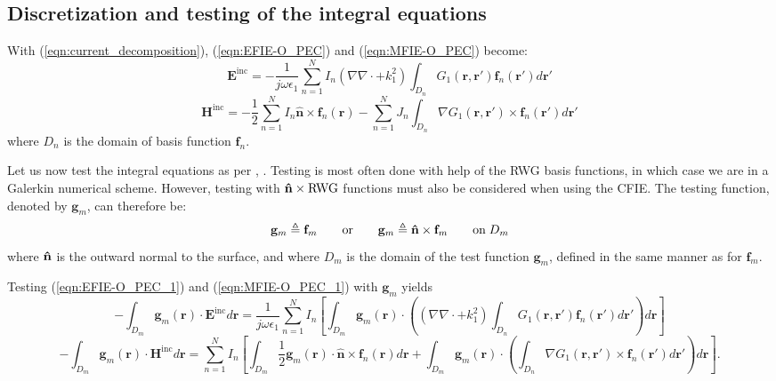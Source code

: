 \documentclass[a4paper,10pt]{book}
\newcommand{\field}[1]{\mathbf{#1}}
\newcommand{\current}[1]{\mathbf{#1}}
\newcommand{\vect}[1]{\mathbf{#1}}
\newcommand{\uvect}[1]{\ensuremath{\mathbf{\Hat{#1}}}}
\renewcommand{\arg}[1]{\ensuremath{\!\left(#1\right)}}
\begin{document}
\subsection{Discretization and testing of the integral equations}
%
\par
With (\ref{eqn:current_decomposition}), (\ref{eqn:EFIE-O_PEC}) and (\ref{eqn:MFIE-O_PEC}) become:
\begin{equation}\label{eqn:EFIE-O_PEC_1}
\field{E}^\text{inc} =  - \frac{1}{j \omega \epsilon_1} \sum_{n=1}^{N} I_n \left(\nabla \nabla \cdot + k_1^2\right) \int_{D_n} G_1\left(\vect{r}, \vect{r}'\right) \current{f}_n\left(\vect{r}'\right) d\vect{r}'
\end{equation}
\begin{equation}\label{eqn:MFIE-O_PEC_1}
\field{H}^\text{inc} = - \frac{1}{2} \sum_{n=1}^{N} I_n \vect{\hat{n}} \times \current{f}_{n}\arg{\vect{r}} - \sum_{n=1}^{N} J_n \int_{D_n} \nabla G_1\left(\vect{r}, \vect{r}'\right) \times \current{f}_n\left(\vect{r}'\right) d\vect{r}'
\end{equation}
where $D_n$ is the domain of basis function $\vect{f}_n$.
%
\par
Let us now test the integral equations as per \cite{Har_68}, \cite{Rao_82}. Testing is most often done with help of the RWG basis functions, in which case we are in a Galerkin numerical scheme.  However, testing with $\uvect{n} \times \text{RWG}$ functions must also be considered when using the CFIE. The testing function, denoted by $\vect{g}_m$, can therefore be:
\begin{equation}
\vect{g}_m \triangleq \vect{f}_m \qquad \text{or} \qquad \vect{g}_m \triangleq \uvect{n} \times \vect{f}_m \qquad \text{on} \; D_m
\end{equation}
where $\uvect{n}$ is the outward normal to the surface, and where $D_m$ is the domain of the test function $\vect{g}_m$, defined in the same manner as for $\vect{f}_m$.
%
\par
Testing (\ref{eqn:EFIE-O_PEC_1}) and (\ref{eqn:MFIE-O_PEC_1}) with $\vect{g}_m$ yields
\begin{equation}\label{eqn:EFIE-O_PEC_2}
\boxed{-\int_{D_m}\vect{g}_m \arg{\vect{r}} \cdot \field{E}^\text{inc} d\vect{r} =  \frac{1}{j \omega \epsilon_1} \sum_{n=1}^{N} I_n \left[\int_{D_m}\vect{g}_m \arg{\vect{r}} \cdot \left( \left(\nabla \nabla \cdot + k_1^2\right) \int_{D_n} G_1\left(\vect{r}, \vect{r}'\right) \current{f}_n\left(\vect{r}'\right) d\vect{r}' \right) d\vect{r} \right]}
\end{equation}
\begin{equation}\label{eqn:MFIE-O_PEC_2}
\boxed{-\int_{D_m}\vect{g}_m \arg{\vect{r}} \cdot \field{H}^\text{inc} d\vect{r} = \sum_{n=1}^{N} I_n \left[\int_{D_m} \frac{1}{2} \vect{g}_m \arg{\vect{r}} \cdot \vect{\hat{n}} \times \current{f}_{n}\arg{\vect{r}}d\vect{r} + \int_{D_m} \vect{g}_m \arg{\vect{r}} \cdot \left(\int_{D_n} \nabla G_1\left(\vect{r}, \vect{r}'\right) \times \current{f}_n\left(\vect{r}'\right) d\vect{r}'\right) d\vect{r} \right]}.
\end{equation}
\end{document}
